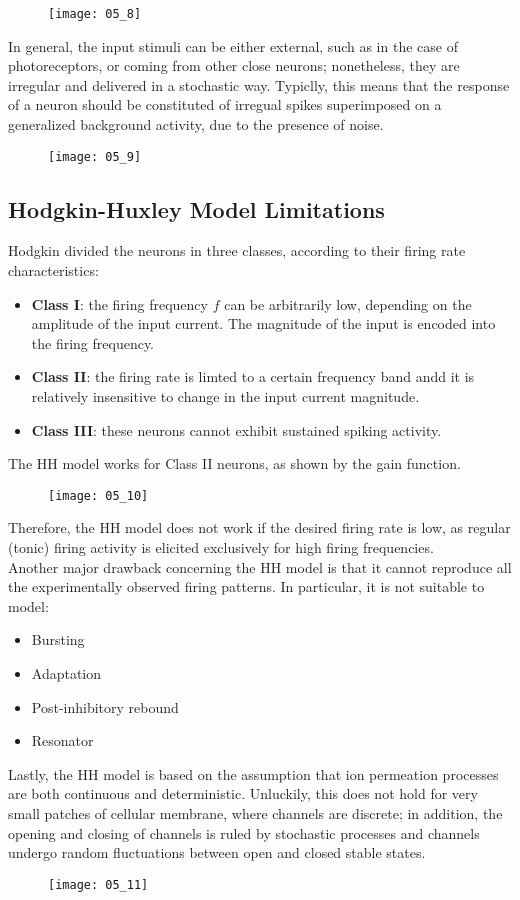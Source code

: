 \begin{figure}[H]
    \texttt{[image: 05\_8]}
    \centering
\end{figure}
In general, the input stimuli can be either external, such as in the case of photoreceptors,
or coming from other close neurons; nonetheless, they are irregular and delivered in a
stochastic way. Typiclly, this means that the response of a neuron should be constituted of
irregual spikes superimposed on a generalized background activity, due to the presence of
noise.
\begin{figure}[H]
    \texttt{[image: 05\_9]}
    \centering
\end{figure}

\subsection{Hodgkin-Huxley Model Limitations}
Hodgkin divided the neurons in three classes, according to their firing rate characteristics:
\begin{itemize}
    \item \textbf{Class I}: the firing frequency \(f\) can be arbitrarily low, depending on
          the amplitude of the input current. The magnitude of the input is encoded into the
          firing frequency.
    \item \textbf{Class II}: the firing rate is limted to a certain frequency band andd it is
          relatively insensitive to change in the input current magnitude.
    \item \textbf{Class III}: these neurons cannot exhibit sustained spiking activity.
\end{itemize}
The HH model works for Class II neurons, as shown by the gain function.
\begin{figure}[H]
    \texttt{[image: 05\_10]}
    \centering
\end{figure}
Therefore, the HH model does not work if the desired firing rate is low, as regular (tonic)
firing activity is elicited exclusively for high firing frequencies.\\
Another major drawback concerning the HH model is that it cannot reproduce all the
experimentally observed firing patterns. In particular, it is not suitable to model:
\begin{itemize}
    \item Bursting
    \item Adaptation
    \item Post-inhibitory rebound
    \item Resonator
\end{itemize}
Lastly, the HH model is based on the assumption that ion permeation processes are
both continuous and deterministic. Unluckily, this does not hold for very small patches of
cellular membrane, where channels are discrete; in addition, the opening and closing of
channels is ruled by stochastic processes and channels undergo random fluctuations between
open and closed stable states.
\begin{figure}[H]
    \texttt{[image: 05\_11]}
    \centering
\end{figure}